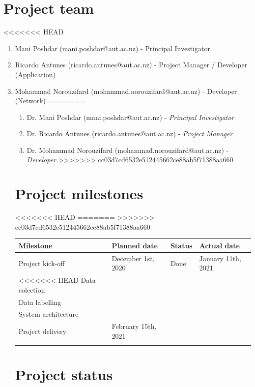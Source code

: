 \documentclass{article}
\begin{document}
\section{Project team}
<<<<<<< HEAD
\label{sec:org96daab8}
\begin{enumerate}
\item Mani Poshdar (mani.poshdar@aut.ac.nz) - Principal Investigator
\item Ricardo Antunes (ricardo.antunes@aut.ac.nz) - Project Manager / Developer (Application)
\item Mohammad Norouzifard (mohammad.norouzifard@aut.ac.nz) - Developer (Network)
=======
\label{sec:orgc4070b4}
\begin{enumerate}
\item Dr. Mani Poshdar (mani.poshdar@aut.ac.nz) - \emph{Principal Investigator}
\item Dr. Ricardo Antunes (ricardo.antunes@aut.ac.nz) - \emph{Project Manager}
\item Dr. Mohammad Norouzifard (mohammad.norouzifard@aut.ac.nz) - \emph{Developer}
>>>>>>> cc03d7cd6532e512445662ce88ab5f71388aa660
\end{enumerate}


\section{Project milestones}
<<<<<<< HEAD
\label{sec:org0610de0}
=======
\label{sec:orgf7d8e55}
>>>>>>> cc03d7cd6532e512445662ce88ab5f71388aa660

\begin{center}
\begin{tabular}{llll}
Milestone & Planned date & Status & Actual date\\
\hline
Project kick-off & December 1st, 2020 & Done & January 11th, 2021\\
<<<<<<< HEAD
Data colection &  &  & \\
Data labelling &  &  & \\
System architecture &  &  & \\
Project delivery & February 15th, 2021 &  & \\
 &  &  & \\
\end{tabular}
\end{center}

\section{Project status}
\label{sec:org0c03505}


\end{enumerate}
\end{document}
